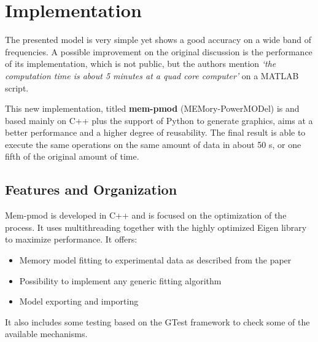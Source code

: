 \section{Implementation}
The presented model is very simple yet shows a good accuracy on a wide band of frequencies. A possible improvement on the original discussion is the performance of its implementation, which is not public, but the authors mention \textit{`the computation time is about 5 minutes at a quad core
computer'}\cite{Hao-HsiangChuang2010ABCP} on a MATLAB script\autocite{5451081}.

This new implementation, titled \textbf{mem-pmod} (MEMory-PowerMODel) is  and based mainly on C++ plus the support of Python to generate graphics, aims at a better performance and a higher degree of reusability. The final result is able to execute the same operations on the same amount of data in about 50 s, or one fifth of the original amount of time.

\subsection{Features and Organization}
Mem-pmod is developed in C++ and is focused on the optimization of the process. It uses multithreading together with the highly optimized Eigen library to maximize performance. It offers:
\begin{itemize}
    \item Memory model fitting to experimental data as described from the paper
    \item Possibility to implement any generic fitting algorithm
    \item Model exporting and importing
\end{itemize}
It also includes some testing based on the GTest framework to check some of the available mechanisms.

